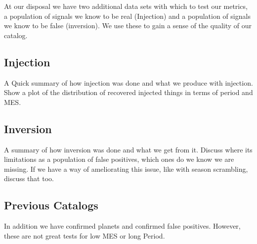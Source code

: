  At our disposal we have two additional data sets with which to test our metrics, a population of signals we know to be real (Injection) and a population of signals we know to be false (inversion). We use these to gain a sense of the quality of our catalog.

\subsection{Injection}
\label{injectsec}

A Quick summary of how injection was done and what we produce with injection. Show a plot of the distribution of recovered injected things in terms of period and MES.

\subsection{Inversion} 
A summary of how inversion was done and what we get from it. Discuss where its limitations as a population of false positives, which ones do we know we are missing. If we have a way of ameliorating this issue, like with season scrambling, discuss that too.

\subsection{Previous Catalogs}In addition we have confirmed planets and confirmed false positives. However, these are not great tests for low MES or long Period.